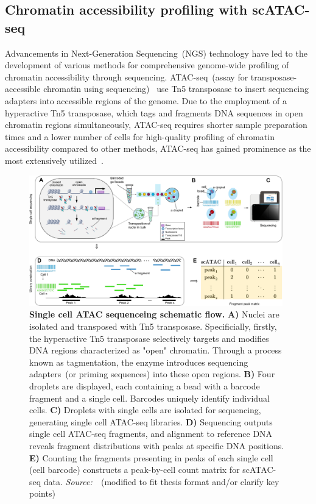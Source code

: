 \subsection{Chromatin accessibility profiling with scATAC-seq}
\label{background:sec1:scATAC}

Advancements in Next-Generation Sequencing~(NGS) technology have led to the development of various methods for comprehensive genome-wide profiling of chromatin accessibility through sequencing. ATAC-seq~(assay for transposase-accessible chromatin using sequencing)~\citep{buenrostro2013atacseq} use Tn5 transposase to insert sequencing adapters into accessible regions of the genome. Due to the employment of a hyperactive Tn5 transposase, which tags and fragments DNA sequences in open chromatin regions simultaneously, ATAC-seq requires shorter sample preparation times and a lower number of cells for high-quality profiling of chromatin accessibility compared to other methods, ATAC-seq has gained prominence as the most extensively utilized~\citep{minnoye2021chromatin}.

\begin{figure}[!ht]
	\centering
	\includegraphics[width=0.98\textwidth]{scATAC-seq/fig}
	\vspace{0.1cm}
	\caption[Single cell ATAC sequenceing schematic flow.]{ \textbf{Single cell ATAC sequenceing schematic flow.} \textbf{A)} Nuclei are isolated and transposed with Tn5 transposase. Specificially, firstly, the hyperactive Tn5 transposase selectively targets and modifies DNA regions characterized as "open" chromatin. Through a process known as tagmentation, the enzyme introduces sequencing adapters~(or priming sequences) into these open regions. \textbf{B)} Four droplets are displayed, each containing a bead with a barcode fragment and a single cell. Barcodes uniquely identify individual cells. \textbf{C)} Droplets with single cells are isolated for sequencing, generating single cell ATAC-seq libraries. \textbf{D)} Sequencing outputs single cell ATAC-seq fragments, and alignment to reference DNA reveals fragment distributions with peaks at specific DNA positions. \textbf{E)} Counting the fragments presenting in peaks of each single cell (cell barcode) constructs a peak-by-cell count matrix for scATAC-seq data. \emph{Source:~\cite{yan2020reads}}~(modified to fit thesis format and/or clarify key points)}
	\label{fig:scATAC-seq}
\end{figure}

